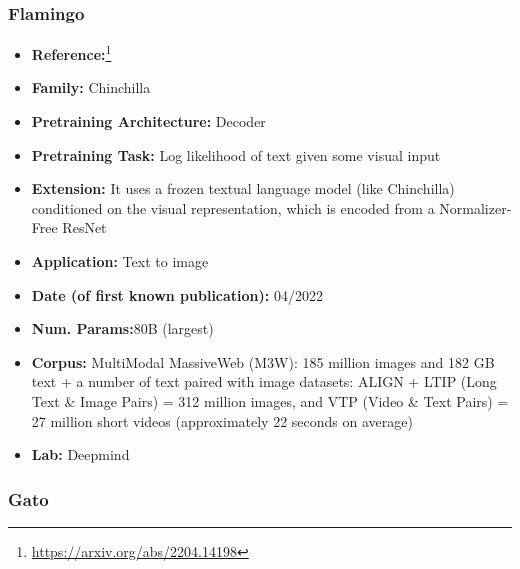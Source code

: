 \documentclass{article}
\begin{document}
\subsubsection{Flamingo}

            \begin{itemize}
                \item \textbf{Reference:}\footnote{\url{https://arxiv.org/abs/2204.14198}}\cite{alayrac2022flamingo}
                \item \textbf{Family:} Chinchilla 
                \item \textbf{Pretraining Architecture:} Decoder
                \item \textbf{Pretraining Task:} Log likelihood of text given some visual input
                \item \textbf{Extension:} It uses a frozen textual language model (like Chinchilla) conditioned on the visual representation, which is encoded from a Normalizer-Free ResNet  
                \item \textbf{Application:} Text to image
                \item \textbf{Date (of first known publication):} 04/2022
                \item \textbf{Num. Params:}80B (largest)
                \item \textbf{Corpus:} MultiModal MassiveWeb (M3W): 185 million images and 182 GB text + a number of text paired with image datasets: ALIGN + LTIP (Long Text \& Image Pairs) = 312 million images, and VTP (Video \& Text Pairs) = 27 million short videos (approximately 22 seconds on average)
                \item \textbf{Lab:} Deepmind
            \end{itemize}
            
\subsubsection{Gato}
\end{document}
